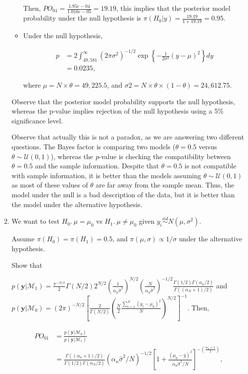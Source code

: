 \begin{enumerate}[leftmargin=*]
\begin{itemize}
Then, $PO_{01}=\frac{1.95e-04}{1.016e-05}=19.19$, this implies that the posterior model probability under the null hypothesis is $\pi(H_0|y)=\frac{19.19}{1+19.19}=0.95$.

\item Under the null hypothesis, 

\begin{align*}
	p & = 2\int_{49,581}^{\infty} (2\pi \sigma^2)^{-1/2}\exp\left\{-\frac{1}{2\sigma^2}(y-\mu)^2\right\}dy\\
	& = 0.0235,
\end{align*}
 
 where $\mu=N\times \theta=49,225.5$, and $\sigma{2}= N\times \theta \times (1-\theta)=24,612.75$.

\end{itemize}

Observe that the posterior model probability supports the null hypothesis, whereas the p-value implies rejection of the null hypothesis using a 5\% significance level.

Observe that actually this is not a paradox, as we are answering two different questions. The Bayes factor is comparing two models ($\theta = 0.5$ versus $\theta\sim\mathcal{U}(0,1)$), whereas the \textit{p}-value is checking the compatibility between $\theta=0.5$ and the sample information. Despite that $\theta=0.5$ is not compatible with sample information, it is better than the models assuming $\theta\sim\mathcal{U}(0,1)$ as most of these values of $\theta$ are far away from the sample mean. Thus, the model under the null is a bad description of the data, but it is better than the model under the alternative hypothesis.      

\item We want to test $H_0. \ \mu=\mu_0$ vs $H_1. \ \mu \neq \mu_0$ given $y_i\stackrel{iid}{\sim}N(\mu,\sigma^2)$.

Assume $\pi(H_0)=\pi(H_1)=0.5$, and $\pi(\mu,\sigma)\propto 1/\sigma$ under the alternative hypothesis.

Show that

$p(\mathbf{y}|\mathcal{M}_1)=\frac{\pi^{-N/2}}{2}\Gamma(N/2)2^{N/2}\left(\frac{1}{\alpha_n\hat{\sigma}^2}\right)^{N/2}\left(\frac{N}{\alpha_n\hat{\sigma}^2}\right)^{-1/2}\frac{\Gamma(1/2)\Gamma(\alpha_n/2)}{\Gamma((\alpha_N+1)/2)}$ and $p(\mathbf{y}|\mathcal{M}_0)=(2\pi)^{-N/2}\left[\frac{2}{\Gamma(N/2)}\left(\frac{N}{2}\frac{\sum_{i=1}^N(y_i-\mu_0)^2}{N}\right)^{N/2}\right]^{-1}$. Then,

\begin{align*}
	PO_{01}&=\frac{p(\mathbf{y}|\mathcal{M}_0)}{p(\mathbf{y}|\mathcal{M}_1)}\\
	& =\frac{\Gamma((\alpha_n+1)/2)}{\Gamma(1/2)\Gamma(\alpha_N/2)}(\alpha_n\hat{\sigma}^2/N)^{-1/2}\left[1+\frac{(\mu_0-\bar{y})^2}{\alpha_n\hat{\sigma}^2/N}\right]^{-\left(\frac{\alpha_n+1}{2}\right)},
\end{align*}


\end{enumerate}

